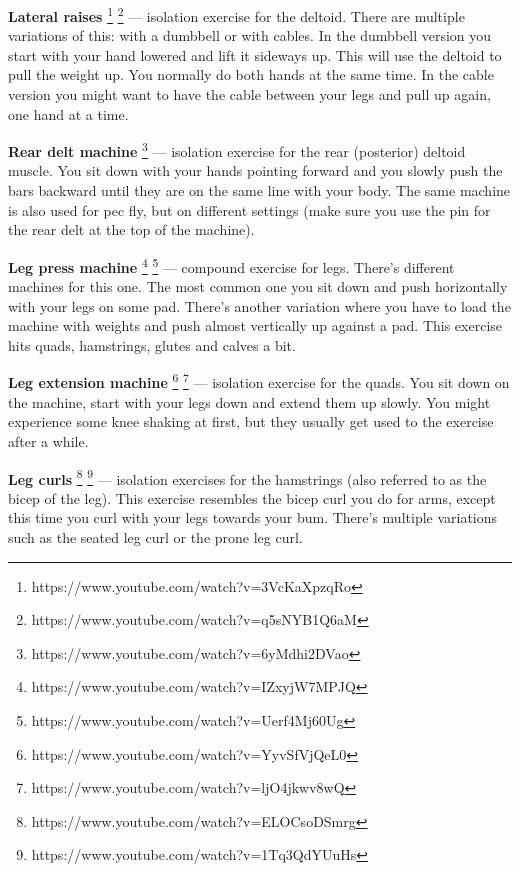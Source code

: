 \documentclass[openany, 12pt]{book}
\begin{document}
        \textbf{Lateral raises}
        \footnote{https://www.youtube.com/watch?v=3VcKaXpzqRo}
        \footnote{https://www.youtube.com/watch?v=q5sNYB1Q6aM}
        ---
        isolation exercise for the deltoid. There are multiple variations of this: with a dumbbell or with cables. In the dumbbell version you start with your hand lowered and lift it sideways up.
        This will use the deltoid to pull the weight up. You normally do both hands at the same time.
        In the cable version you might want to have the cable between your legs and pull up again, one hand at a time.

        \textbf{Rear delt machine}
        \footnote{https://www.youtube.com/watch?v=6yMdhi2DVao}
        ---
        isolation exercise for the rear (posterior) deltoid muscle. You sit down with your hands pointing forward and you slowly push the bars backward until they are on the same line with your body.
        The same machine is also used for pec fly, but on different settings (make sure you use the pin for the rear delt at the top of the machine).

        \textbf{Leg press machine}
        \footnote{https://www.youtube.com/watch?v=IZxyjW7MPJQ}
        \footnote{https://www.youtube.com/watch?v=Uerf4Mj60Ug}
        ---
        compound exercise for legs. There's different machines for this one. The most common one you sit down and push horizontally with your legs on some pad. There's another variation where you
        have to load the machine with weights and push almost vertically up against a pad. This exercise hits quads, hamstrings, glutes and calves a bit.

        \textbf{Leg extension machine}
        \footnote{https://www.youtube.com/watch?v=YyvSfVjQeL0}
        \footnote{https://www.youtube.com/watch?v=ljO4jkwv8wQ}
        ---
        isolation exercise for the quads. You sit down on the machine, start with your legs down and extend them up slowly. You might experience some knee shaking at first, but they usually get used
        to the exercise after a while.
        
        \textbf{Leg curls}
        \footnote{https://www.youtube.com/watch?v=ELOCsoDSmrg}
        \footnote{https://www.youtube.com/watch?v=1Tq3QdYUuHs}
        ---
        isolation exercises for the hamstrings (also referred to as the bicep of the leg). This exercise resembles the bicep curl you do for arms, except this time you curl with your legs
        towards your bum.
        There's multiple variations such as the seated leg curl or the prone leg curl.
\end{document}
